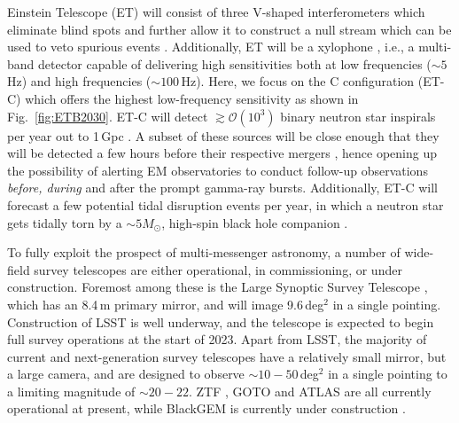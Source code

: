 \documentclass{aa}
\begin{document}
 Einstein Telescope (ET) will consist of three
 V-shaped interferometers which eliminate blind spots and further allow it to construct a null
 stream \citep{Sathyaprakash:2012jk} which can be used to veto spurious events \citep{Wen:2005ui}. 
 Additionally, ET will be a xylophone \citep{Hild:2009ns}, i.e., a multi-band detector capable of delivering high sensitivities both at low frequencies ($\sim 5\,$Hz) and high frequencies ($\sim 100\,$Hz). 
 Here, we focus on the C configuration (ET-C) which offers the highest low-frequency sensitivity as shown in Fig.~\ref{fig:ETB2030}.
 ET-C will detect $\gtrsim\mathcal{O}(10^3)$ binary neutron star inspirals per year out to 1\,Gpc \citep{Akcay18}.  %
 A subset of these sources will be close enough that they will be detected a few hours
before their respective mergers \citep{Akcay18}, hence opening up the possibility of alerting EM
observatories to conduct follow-up observations \emph{before, during} and after the prompt gamma-ray bursts. Additionally, ET-C will forecast a few potential tidal disruption events per year, in which
a neutron star gets tidally torn by a $\sim 5 M_\odot$, high-spin black hole companion \citep{Akcay18}.


To fully exploit the prospect of multi-messenger astronomy, a number of wide-field survey telescopes are either operational, in commissioning, or under construction. Foremost among these is the Large Synoptic Survey Telescope \citep[LSST;][]{LSSTbook}, which has an 8.4\,m primary mirror, and will image 9.6\,deg$^2$ in a single pointing. Construction of LSST is well underway, and the telescope is expected to begin full survey operations at the start of 2023. Apart from LSST, the majority of current and next-generation survey telescopes have a relatively small mirror, but a large camera, and are designed to observe $\sim10 - 50\,$deg$^2$ in a single pointing to a limiting magnitude of $\sim20-22$. ZTF \citep{ZTF}, GOTO \citep{GOTO} and ATLAS \citep{ATLAS} are all currently operational at present, while BlackGEM is currently under construction \citep{BlackGEM}.
\end{document}
